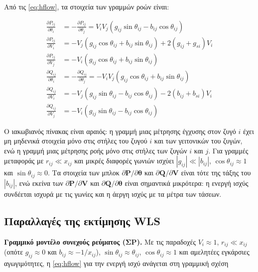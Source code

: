 Από τις \eqref{eq:hflow}, τα στοιχεία των γραμμών ροών είναι:

\begin{align}
\frac{\partial P_{ij}}{\partial \theta_i} &= -\frac{\partial P_{ij}}{\partial \theta_j}
  = V_i V_j \left( g_{ij}\sin\theta_{ij} - b_{ij}\cos\theta_{ij} \right) \\
\frac{\partial P_{ij}}{\partial V_i} &= -V_j \left( g_{ij}\cos\theta_{ij} + b_{ij}\sin\theta_{ij} \right) + 2\left( g_{ij} + g_{si} \right) V_i \\
\frac{\partial P_{ij}}{\partial V_j} &= -V_i \left( g_{ij}\cos\theta_{ij} + b_{ij}\sin\theta_{ij} \right) \\
\frac{\partial Q_{ij}}{\partial \theta_i} &= -\frac{\partial Q_{ij}}{\partial \theta_j}
  = -V_i V_j \left( g_{ij}\cos\theta_{ij} + b_{ij}\sin\theta_{ij} \right) \\
\frac{\partial Q_{ij}}{\partial V_i} &= -V_j \left( g_{ij}\sin\theta_{ij} - b_{ij}\cos\theta_{ij} \right) - 2\left( b_{ij} + b_{si} \right) V_i \\
\frac{\partial Q_{ij}}{\partial V_j} &= -V_i \left( g_{ij}\sin\theta_{ij} - b_{ij}\cos\theta_{ij} \right)
\label{eq:jacflow}
\end{align}

Ο ιακωβιανός πίνακας είναι αραιός: η γραμμή μιας μέτρησης έγχυσης στον ζυγό $i$ έχει μη μηδενικά
στοιχεία μόνο στις στήλες του ζυγού $i$ και των γειτονικών του ζυγών, ενώ η γραμμή μιας
μέτρησης ροής μόνο στις στήλες των ζυγών $i$ και $j$. Για γραμμές μεταφοράς με
$r_{ij} \ll x_{ij}$ και μικρές διαφορές γωνιών ισχύει $|g_{ij}| \ll |b_{ij}|$,
$\cos\theta_{ij} \approx 1$ και $\sin\theta_{ij} \approx 0$. Τα στοιχεία των μπλοκ
$\partial\mathbf{P}/\partial\boldsymbol{\theta}$ και $\partial\mathbf{Q}/\partial\mathbf{V}$
είναι τότε της τάξης του $|b_{ij}|$, ενώ εκείνα των $\partial\mathbf{P}/\partial\mathbf{V}$ και
$\partial\mathbf{Q}/\partial\boldsymbol{\theta}$ είναι σημαντικά μικρότερα: η ενεργή ισχύς
συνδέεται ισχυρά με τις γωνίες και η άεργη ισχύς με τα μέτρα των τάσεων.

\subsection{Παραλλαγές της εκτίμησης WLS}
\label{sec:wls-variants}

\textbf{Γραμμικό μοντέλο συνεχούς ρεύματος (ΣΡ).} Με τις παραδοχές $V_i \approx 1$, $r_{ij} \ll x_{ij}$ (οπότε
$g_{ij} \approx 0$ και $b_{ij} \approx -1/x_{ij}$), $\sin\theta_{ij} \approx \theta_{ij}$,
$\cos\theta_{ij} \approx 1$ και αμελητέες εγκάρσιες αγωγιμότητες, η \eqref{eq:hflow} για την
ενεργή ισχύ ανάγεται στη γραμμική σχέση

